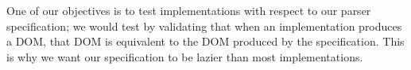 %

One of our objectives is to test implementations
with respect to our parser specification;
we would test by validating that when an implementation produces a DOM,
that DOM is equivalent to the DOM produced by the specification.
This is why we want our specification to be lazier than most implementations.


